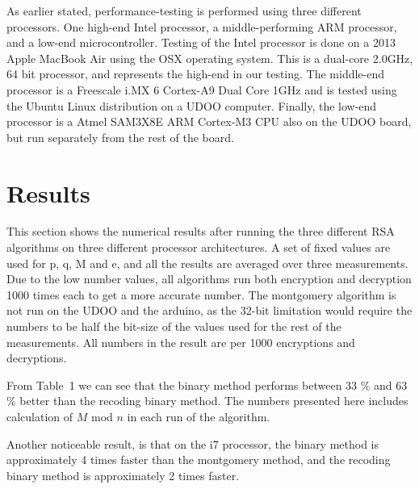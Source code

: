\documentclass[twocolumn]{IEEEtran}
\begin{document}
As earlier stated, performance-testing is performed using three different processors. One high-end Intel processor, a middle-performing ARM processor, and a low-end microcontroller. Testing of the Intel processor is done on a 2013 Apple MacBook Air using the OSX operating system. This is a dual-core 2.0GHz, 64 bit processor, and represents the high-end in our testing. The middle-end processor is a Freescale i.MX 6 Cortex-A9 Dual Core 1GHz and is tested using the Ubuntu Linux distribution on a UDOO computer. Finally, the low-end processor is a Atmel SAM3X8E ARM Cortex-M3 CPU also on the UDOO board, but run separately from the rest of the board.

\section{Results}
This section shows the numerical results after running the three different RSA algorithms on three different processor architectures. A set of fixed values are used for p, q, M and e, and all the results are averaged over three measurements. Due to the low number values, all algorithms run both encryption and decryption 1000 times each to get a more accurate number. The montgomery algorithm is not run on the UDOO and the arduino, as the 32-bit limitation would require the numbers to be half the bit-size of the values used for the rest of the measurements. All numbers in the result are per 1000 encryptions and decryptions.

From Table~1 we can see that the binary method performs between 33 \% and 63 \% better than the recoding binary method. The numbers presented here includes calculation of $M$ mod $n$ in each run of the algorithm.

Another noticeable result, is that on the i7 processor, the binary method is approximately 4 times faster than the montgomery method, and the recoding binary method is approximately 2 times faster. 
\end{document}
